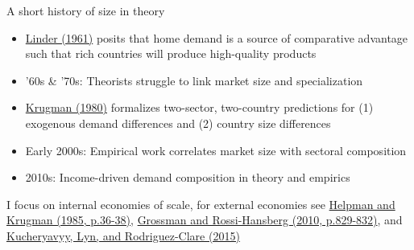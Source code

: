 \documentclass[10pt,notes=hide]{beamer}
\begin{document}
\begin{frame}{A short history of size in theory}
\begin{itemize}
	\item \href{https://books.google.com/books?id=fJM_cAAACAAJ}{Linder (1961)} posits that home demand is a source of comparative advantage such that rich countries will produce high-quality products
	\item '60s \& '70s: Theorists struggle to link market size and specialization
	\item \href{https://assets.aeaweb.org/assets/production/journals/aer/top20/70.5.950-959.pdf}{Krugman (1980)} formalizes two-sector, two-country predictions for (1) exogenous demand differences and (2) country size differences
	\item Early 2000s: Empirical work correlates market size with sectoral composition
	\item 2010s: Income-driven demand composition in theory and empirics
\end{itemize}
I focus on internal economies of scale, for external economies see \href{https://mitpress.mit.edu/books/market-structure-and-foreign-trade}{Helpman and Krugman (1985, p.36-38)}, \href{http://qje.oxfordjournals.org/content/125/2/829.abstract}{Grossman and Rossi-Hansberg (2010, p.829-832)}, and \href{http://eml.berkeley.edu/~arodeml/}{Kucheryavyy, Lyn, and Rodriguez-Clare (2015)}
 
\end{frame}
\end{document}
